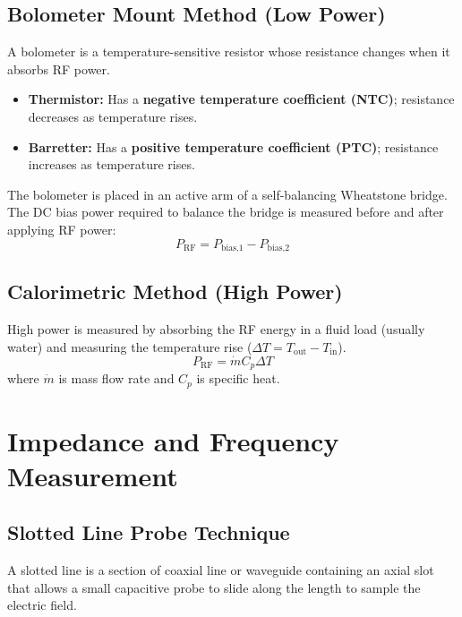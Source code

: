 \documentclass[12pt,a4paper]{article}
\begin{document}
\subsection{Bolometer Mount Method (Low Power)}
A bolometer is a temperature-sensitive resistor whose resistance changes when it absorbs RF power.
\begin{itemize}[leftmargin=*, itemsep=3pt]
  \item \textbf{Thermistor:} Has a \textbf{negative temperature coefficient (NTC)}; resistance decreases as temperature rises.
  \item \textbf{Barretter:} Has a \textbf{positive temperature coefficient (PTC)}; resistance increases as temperature rises.
\end{itemize}
The bolometer is placed in an active arm of a self-balancing Wheatstone bridge. The DC bias power required to balance the bridge is measured before and after applying RF power:
\begin{equation}
  P_{\text{RF}} = P_{\text{bias,1}} - P_{\text{bias,2}}
\end{equation}

\subsection{Calorimetric Method (High Power)}
High power is measured by absorbing the RF energy in a fluid load (usually water) and measuring the temperature rise ($\Delta T = T_{\text{out}} - T_{\text{in}}$).
\begin{equation}
  P_{\text{RF}} = \dot{m} C_p \Delta T
\end{equation}
where $\dot{m}$ is mass flow rate and $C_p$ is specific heat.

\section{Impedance and Frequency Measurement}

\subsection{Slotted Line Probe Technique}
A slotted line is a section of coaxial line or waveguide containing an axial slot that allows a small capacitive probe to slide along the length to sample the electric field.
\end{document}
